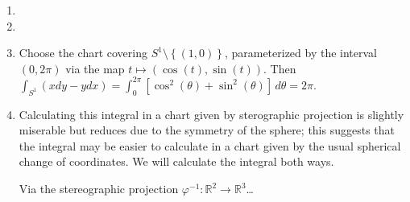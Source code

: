 \documentclass[11pt,leqno]{article}
\theoremstyle{plain}
\theoremstyle{definition}
\numberwithin{equation}{section}
\numberwithin{lem}{section}
\newcommand{\cbr}[1]{\left\{#1\right\}}
\begin{document}
\begin{enumerate}
    \item 
    \item 
    \item Choose the chart covering $S^1\setminus\cbr{(1,0)}$, parameterized by the interval $(0,2\pi)$ via the map $t\mapsto (\cos(t),\sin(t))$. Then $\int_{S^1}(xdy-ydx) = \int_0^{2\pi}[\cos^2(\theta) + \sin^2(\theta)]\,d\theta = 2\pi$.
    \item Calculating this integral in a chart given by sterographic projection is slightly miserable but reduces due to the symmetry of the sphere; this suggests that the integral may be easier to calculate in a chart given by the usual spherical change of coordinates. We will calculate the integral both ways.
    
    Via the stereographic projection $\varphi^{-1}\colon \mathbb R^2\to\mathbb R^3$\dots


\end{enumerate}
\end{document}
